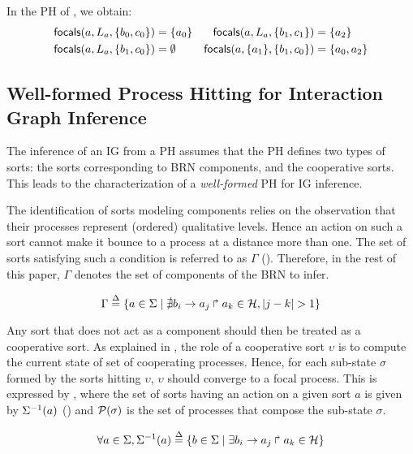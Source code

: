 \begin{example}
In the PH of , we obtain:
\begin{align*}
\mathsf{focals}(a,L_a,\{b_0,c_0\}) &= \{ a_0 \}
&
\mathsf{focals}(a,L_a,\{b_1,c_1\}) &= \{ a_2 \}
\\
\mathsf{focals}(a,L_a,\{b_1,c_0\}) &= \emptyset
&
\mathsf{focals}(a,\{a_1\},\{b_1,c_0\}) &= \{ a_0, a_2 \}
\end{align*}
\end{example}



\subsection{Well-formed Process Hitting for Interaction Graph Inference}\label{ssec:wf}

The inference of an IG from a PH assumes that the PH defines two types of sorts:
the sorts corresponding to BRN components, and the cooperative sorts.
This leads to the characterization of a \emph{well-formed} PH for IG inference.

The identification of sorts modeling components relies on the observation that their processes
represent (ordered) qualitative levels.
Hence an action on such a sort cannot make it bounce to a process at a distance more than one.
The set of sorts satisfying such a condition is referred to as $\Gamma$
().
Therefore, in the rest of this paper, $\Gamma$ denotes the set of components of the BRN to infer.

\begin{equation}
\Gamma \stackrel{\Delta}= \{a \in \Sigma \mid \nexists b_i\rightarrow a_j\Rsh a_k \in \mathcal{H}, |j - k| > 1\} \\
\label{eq:PH-components}
\end{equation}

Any sort that does not act as a component should then be treated as a cooperative sort.
As explained in , the role of a cooperative sort $\upsilon$ is to compute the current
state of set of cooperating processes.
Hence, for each sub-state $\sigma$ formed by the sorts hitting $\upsilon$, $\upsilon$ should
converge to a focal process.
This is expressed by , where
the set of sorts having an action on a given sort $a$ is given by 
$\Sigma^{-1}(a)$ ()
and $\mathcal{P}(\sigma)$ is the set of processes that compose the sub-state $\sigma$.

\begin{equation}
\forall a \in \Sigma, \Sigma^{-1}(a) \stackrel{\Delta}= \{b \in \Sigma \mid \exists b_i\rightarrow a_j\Rsh a_k\in\mathcal{H} \}
\label{eq:ph_direct_predec}
\end{equation}

